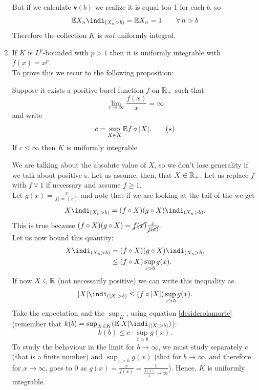 \documentclass{report}
\begin{document}
\begin{remark}
\begin{enumerate}[\circnum]
\begin{fancyproof}
			But if we calculate $k(b)$ we realize it is equal too 1 for each $b$, so
			\[\ev X_n\indi_{(X_n>b)}=\ev X_n=1\qquad\every n>b\]
			Therefore the collection $K$ is \textit{not} uniformly integral.
		\end{fancyproof}
		\item If $K$ is $L^{p}$-bounded with $p>1$ then it is uniformly integrable with $f(x)=x^p$. \\
		To prove this we recur to the following proposition:
		\begin{proposition}
			Suppose it exists a positive borel function $f$ on $\mathbb{R}_+$ such that
			\[\lim_{x\to\infty}\frac{f(x)}{x}=\infty\]
			and write 
			\begin{equation}
				c=\sup_{X\in K}\mathbb{E} f\circ|X|. \tag{$\star$} \label{desiderolamorte}
			\end{equation}
			If $c\leq \infty$ then $K$ is uniformly integrable.
		\end{proposition}
		\begin{fancyproof}
			We are talking about the absolute value of $X$, so we don't lose generality if we talk about positive \rv{}s. Let us assume, then, that $X\in\mathbb{R}_+$. Let us replace $f$ with $f\vee1$ if necessary and assume $f\geq1$.\\
			Let $g(x)=\frac{x}{f)=(x)}$ and note that if we are looking at the tail of the \rv{} we get
			\[X\indi_{(X_n>b)}=(f\circ X)(g\circ X)\indi_{(X_n>b)}.\]
			This is true because $(f\circ X)(g\circ X)=\cancel{f(x)}\frac{x}{\cancel{f(x)}}$.\\
			Let us now bound this quantity:
			\begin{align*}
				X\indi_{(X_n>b)}&=(f\circ X)(g\circ X)\indi_{(X_n>b)}\\
				&\leq (f\circ X) \sup_{x>b}g(x).
			\end{align*}
			If now $X\in\mathbb{R}$ (not necessarily positive) we can write this inequality as
			\begin{equation*}
				|X|\indi_{(|X|>b)}\leq (f\circ|X|) \sup_{x>b} g(x).
			\end{equation*}
			Take the expectation and the $\sup_{K}$, using equation \ref{desiderolamorte} (remember that $k(b)=\sup_{X\in K}(\ev|X|\indi_{(|X|>b)})$):
			\[k(b)\leq c\cdot \sup_{x>b}g(x).\]
			To study the behaviour in the limit for $b\to\infty$, we must study separately $c$ (that is a finite number) and $\sup_{x>b}g(x)$ (that for $b\to\infty$, and therefore for $x\to\infty$, goes to 0 as $g(x)=\frac{x}{f(x)}=\frac{1}{\frac{f(x)}{x}\to\infty}$).
			Hence, $K$ is uniformly integrable.
		\end{fancyproof}
	\end{enumerate}
\end{remark}
\end{document}
